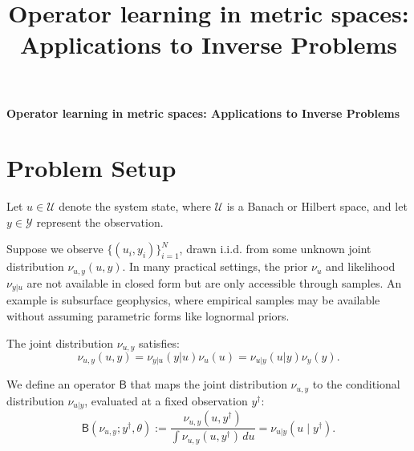 \documentclass[twoside,11pt]{article}
\begin{document}
\title{Operator learning in metric spaces: Applications to Inverse Problems}





\textbf{Operator learning in metric spaces: Applications to Inverse Problems}

\section{Problem Setup}

Let \( u \in \mathcal{U} \) denote the system state, where \(\mathcal{U}\) is a Banach or Hilbert space, and let \( y \in \mathcal{Y} \) represent the observation.

Suppose we observe \(\{(u_i, y_i)\}_{i=1}^N\), drawn i.i.d. from some unknown joint distribution \(\nu_{u,y}(u, y)\). In many practical settings, the prior \(\nu_u\) and likelihood \(\nu_{y|u}\) are not available in closed form but are only accessible through samples. An example is subsurface geophysics, where empirical samples may be available without assuming parametric forms like lognormal priors.

The joint distribution \(\nu_{u,y}\) satisfies:
\[
\nu_{u,y}(u,y) = \nu_{y|u}(y|u) \nu_u(u) = \nu_{u|y}(u|y) \nu_y(y).
\]

We define an operator \(\mathsf{B}\) that maps the joint distribution \(\nu_{u,y}\) to the conditional distribution \(\nu_{u|y}\), evaluated at a fixed observation \(y^\dag\):
\[
\mathsf{B}(\nu_{u,y}; y^\dag, \theta) := \frac{\nu_{u,y}(u, y^\dag)}{\int \nu_{u,y}(u, y^\dag) \, du} = \nu_{u|y}(u \mid y^\dag).
\]
\end{document}

